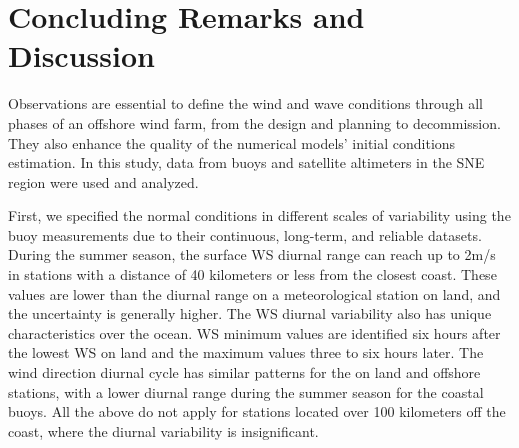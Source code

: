 
\chapter{Concluding Remarks and Discussion} %

\label{Chapter6} %


Observations are essential to define the wind and wave conditions through all phases of an offshore wind farm, from the design and planning to decommission. They also enhance the quality of the numerical models' initial conditions estimation. In this study, data from buoys and satellite altimeters in the SNE region were used and analyzed.

First, we specified the normal conditions in different scales of variability using the buoy measurements due to their continuous, long-term, and reliable datasets. During the summer season, the surface WS diurnal range can reach up to 2m/s in stations with a distance of 40 kilometers or less from the closest coast. These values are lower than the diurnal range on a meteorological station on land, and the uncertainty is generally higher. The WS diurnal variability also has unique characteristics over the ocean. WS minimum values are identified six hours after the lowest WS on land and the maximum values three to six hours later. The wind direction diurnal cycle has similar patterns for the on land and offshore stations, with a lower diurnal range during the summer season for the coastal buoys. All the above do not apply for stations located over 100 kilometers off the coast, where the diurnal variability is insignificant.

